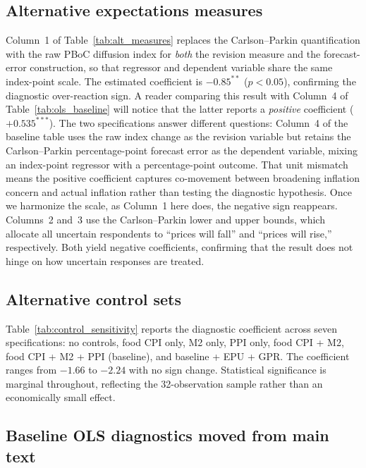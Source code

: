 

\subsection{Alternative expectations measures}

Column~1 of Table~\ref{tab:alt_measures} replaces the
Carlson--Parkin quantification with the raw PBoC
diffusion index for \emph{both} the revision measure and
the forecast-error construction, so that regressor and
dependent variable share the same index-point scale. The
estimated coefficient is $-0.85^{**}$ ($p < 0.05$),
confirming the diagnostic over-reaction sign. A reader
comparing this result with Column~4 of
Table~\ref{tab:ols_baseline} will notice that the latter
reports a \emph{positive} coefficient ($+0.535^{***}$).
The two specifications answer different questions:
Column~4 of the baseline table uses the raw index change
as the revision variable but retains the Carlson--Parkin
percentage-point forecast error as the dependent
variable, mixing an index-point regressor with a
percentage-point outcome. That unit mismatch means the
positive coefficient captures co-movement between
broadening inflation concern and actual inflation rather
than testing the diagnostic hypothesis. Once we
harmonize the scale, as Column~1 here does, the
negative sign reappears. Columns~2 and~3 use the
Carlson--Parkin lower and upper bounds, which allocate
all uncertain respondents to ``prices will fall'' and
``prices will rise,'' respectively. Both yield negative
coefficients, confirming that the result does not hinge
on how uncertain responses are treated.



\subsection{Alternative control sets}

Table~\ref{tab:control_sensitivity} reports the
diagnostic coefficient across seven specifications: no
controls, food CPI only, M2 only, PPI only, food
CPI + M2, food CPI + M2 + PPI (baseline), and
baseline + EPU + GPR. The coefficient ranges from
$-1.66$ to $-2.24$ with no sign change. Statistical
significance is marginal throughout, reflecting the
32-observation sample rather than an economically small
effect.



\subsection{Baseline OLS diagnostics moved from main text}


